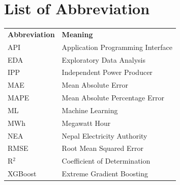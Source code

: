                 \chapter*{List of Abbreviation}
            \endgroup
            \normalsize
            \begin{table}[h]
                \begin{center}
                    \begin{tabular}{l l}
                        \textbf{Abbreviation} & \textbf{Meaning} \\
                        API & Application Programming Interface \\
                        EDA & Exploratory Data Analysis \\
                        IPP & Independent Power Producer \\
                        MAE & Mean Absolute Error \\
                        MAPE & Mean Absolute Percentage Error \\
                        ML & Machine Learning \\
                        MWh & Megawatt Hour \\
                        NEA & Nepal Electricity Authority \\
                        RMSE & Root Mean Squared Error \\
                        R$^2$ & Coefficient of Determination \\
                        XGBoost & Extreme Gradient Boosting \\
                    \end{tabular}
                \end{center}
            \end{table}
        \break
        \pagebreak